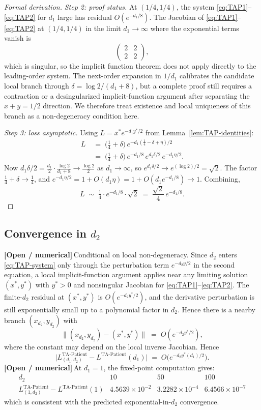 \documentclass{article}
\theoremstyle{plain}
\theoremstyle{definition}
\newcommand{\open}{\textcolor{openred}{\textbf{[Open / numerical]}}\,}
\begin{document}
\begin{proof}[Formal derivation]
\emph{Step 2: proof status.} At $(1/4,1/4)$, the system \eqref{eq:TAP1}--\eqref{eq:TAP2} for $d_1$ large has residual $O(e^{-d_1/8})$. The Jacobian of \eqref{eq:TAP1}--\eqref{eq:TAP2} at $(1/4,1/4)$ in the limit $d_1\to\infty$ where the exponential terms vanish is
\[
\begin{pmatrix} 2 & 2 \\ 2 & 2\end{pmatrix},
\]
which is singular, so the implicit function theorem does not apply directly to the leading-order system. The next-order expansion in $1/d_1$ calibrates the candidate local branch through $\delta=\log 2/(d_1+8)$, but a complete proof still requires a contraction or a desingularized implicit-function argument after separating the $x+y=1/2$ direction. We therefore treat existence and local uniqueness of this branch as a non-degeneracy condition here.

\emph{Step 3: loss asymptotic.} Using $L=x^\ast e^{-d_1 y^\ast/2}$ from Lemma~\ref{lem:TAP-identities}:
\begin{align*}
L \;&=\; \bigl(\tfrac14+\delta\bigr)\,e^{-d_1(\tfrac14-\delta+\eta)/2}\\
&=\;\bigl(\tfrac14+\delta\bigr)\,e^{-d_1/8}\,e^{d_1\delta/2}\,e^{-d_1\eta/2}.
\end{align*}
Now $d_1\delta/2=\frac{d_1}{2}\cdot\frac{\log 2}{d_1+8}\to\frac{\log 2}{2}$ as $d_1\to\infty$, so $e^{d_1\delta/2}\to e^{(\log 2)/2}=\sqrt 2$. The factor $\tfrac14+\delta\to\tfrac14$, and $e^{-d_1\eta/2}=1+O(d_1\eta)=1+O(d_1 e^{-d_1/8})\to 1$. Combining,
\[
L\;\sim\;\tfrac14\cdot e^{-d_1/8}\cdot\sqrt 2\;=\;\frac{\sqrt 2}{4}\,e^{-d_1/8}.
\]
\end{proof}

\subsection{Convergence in $d_2$}

\open Conditional on local non-degeneracy. Since $d_2$ enters \eqref{eq:TAP-system} only through the perturbation term $e^{-d_2 y/2}$ in the second equation, a local implicit-function argument applies near any limiting solution $(x^\ast,y^\ast)$ with $y^\ast>0$ and nonsingular Jacobian for \eqref{eq:TAP1}--\eqref{eq:TAP2}. The finite-$d_2$ residual at $(x^\ast,y^\ast)$ is $O(e^{-d_2y^\ast/2})$, and the derivative perturbation is still exponentially small up to a polynomial factor in $d_2$. Hence there is a nearby branch $(x_{d_2},y_{d_2})$ with
\[
\|(x_{d_2},y_{d_2})-(x^\ast,y^\ast)\|\;=\;O(e^{-d_2 y^\ast/2}),
\]
where the constant may depend on the local inverse Jacobian. Hence
\[
\bigl|L^{\text{TA-Patient}}_{(d_1,d_2)}-L^{\text{TA-Patient}}(d_1)\bigr|\;=\;O\bigl(e^{-d_2 y^\ast(d_1)/2}\bigr).
\]
\open At $d_1=1$, the fixed-point computation gives:
\[
\begin{array}{r|rrr}
d_2 & 10 & 50 & 100\\\hline
L^{\text{TA-Patient}}_{(1,d_2)}-L^{\text{TA-Patient}}(1)
& 4.5639\times 10^{-2} & 3.2282\times 10^{-4} & 6.4566\times 10^{-7}
\end{array}
\]
which is consistent with the predicted exponential-in-$d_2$ convergence.
\end{document}
